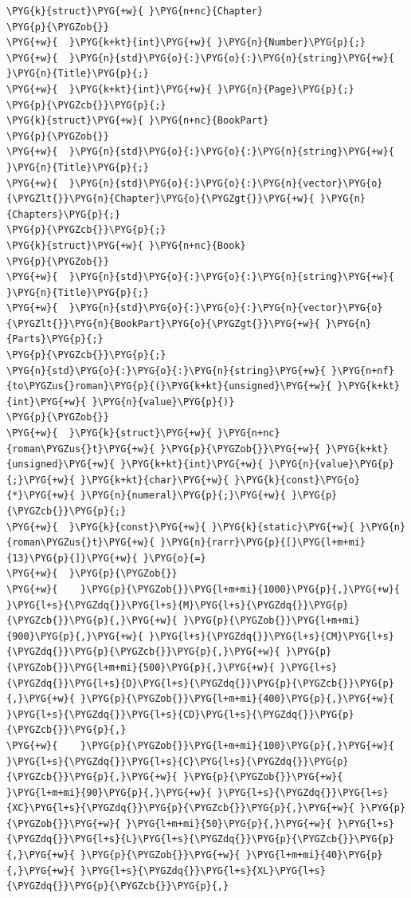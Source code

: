 \begin{codeblockbg}
\begin{Verbatim}[commandchars=\\\{\},breaklines=true,breakanywhere=true,fontsize=\codefont,xleftmargin=17bp]
\PYG{k}{struct}\PYG{+w}{ }\PYG{n+nc}{Chapter}
\PYG{p}{\PYGZob{}}
\PYG{+w}{  }\PYG{k+kt}{int}\PYG{+w}{ }\PYG{n}{Number}\PYG{p}{;}
\PYG{+w}{  }\PYG{n}{std}\PYG{o}{:}\PYG{o}{:}\PYG{n}{string}\PYG{+w}{ }\PYG{n}{Title}\PYG{p}{;}
\PYG{+w}{  }\PYG{k+kt}{int}\PYG{+w}{ }\PYG{n}{Page}\PYG{p}{;}
\PYG{p}{\PYGZcb{}}\PYG{p}{;}
\PYG{k}{struct}\PYG{+w}{ }\PYG{n+nc}{BookPart}
\PYG{p}{\PYGZob{}}
\PYG{+w}{  }\PYG{n}{std}\PYG{o}{:}\PYG{o}{:}\PYG{n}{string}\PYG{+w}{ }\PYG{n}{Title}\PYG{p}{;}
\PYG{+w}{  }\PYG{n}{std}\PYG{o}{:}\PYG{o}{:}\PYG{n}{vector}\PYG{o}{\PYGZlt{}}\PYG{n}{Chapter}\PYG{o}{\PYGZgt{}}\PYG{+w}{ }\PYG{n}{Chapters}\PYG{p}{;}
\PYG{p}{\PYGZcb{}}\PYG{p}{;}
\PYG{k}{struct}\PYG{+w}{ }\PYG{n+nc}{Book}
\PYG{p}{\PYGZob{}}
\PYG{+w}{  }\PYG{n}{std}\PYG{o}{:}\PYG{o}{:}\PYG{n}{string}\PYG{+w}{ }\PYG{n}{Title}\PYG{p}{;}
\PYG{+w}{  }\PYG{n}{std}\PYG{o}{:}\PYG{o}{:}\PYG{n}{vector}\PYG{o}{\PYGZlt{}}\PYG{n}{BookPart}\PYG{o}{\PYGZgt{}}\PYG{+w}{ }\PYG{n}{Parts}\PYG{p}{;}
\PYG{p}{\PYGZcb{}}\PYG{p}{;}
\PYG{n}{std}\PYG{o}{:}\PYG{o}{:}\PYG{n}{string}\PYG{+w}{ }\PYG{n+nf}{to\PYGZus{}roman}\PYG{p}{(}\PYG{k+kt}{unsigned}\PYG{+w}{ }\PYG{k+kt}{int}\PYG{+w}{ }\PYG{n}{value}\PYG{p}{)}
\PYG{p}{\PYGZob{}}
\PYG{+w}{  }\PYG{k}{struct}\PYG{+w}{ }\PYG{n+nc}{roman\PYGZus{}t}\PYG{+w}{ }\PYG{p}{\PYGZob{}}\PYG{+w}{ }\PYG{k+kt}{unsigned}\PYG{+w}{ }\PYG{k+kt}{int}\PYG{+w}{ }\PYG{n}{value}\PYG{p}{;}\PYG{+w}{ }\PYG{k+kt}{char}\PYG{+w}{ }\PYG{k}{const}\PYG{o}{*}\PYG{+w}{ }\PYG{n}{numeral}\PYG{p}{;}\PYG{+w}{ }\PYG{p}{\PYGZcb{}}\PYG{p}{;}
\PYG{+w}{  }\PYG{k}{const}\PYG{+w}{ }\PYG{k}{static}\PYG{+w}{ }\PYG{n}{roman\PYGZus{}t}\PYG{+w}{ }\PYG{n}{rarr}\PYG{p}{[}\PYG{l+m+mi}{13}\PYG{p}{]}\PYG{+w}{ }\PYG{o}{=}
\PYG{+w}{  }\PYG{p}{\PYGZob{}}
\PYG{+w}{    }\PYG{p}{\PYGZob{}}\PYG{l+m+mi}{1000}\PYG{p}{,}\PYG{+w}{ }\PYG{l+s}{\PYGZdq{}}\PYG{l+s}{M}\PYG{l+s}{\PYGZdq{}}\PYG{p}{\PYGZcb{}}\PYG{p}{,}\PYG{+w}{ }\PYG{p}{\PYGZob{}}\PYG{l+m+mi}{900}\PYG{p}{,}\PYG{+w}{ }\PYG{l+s}{\PYGZdq{}}\PYG{l+s}{CM}\PYG{l+s}{\PYGZdq{}}\PYG{p}{\PYGZcb{}}\PYG{p}{,}\PYG{+w}{ }\PYG{p}{\PYGZob{}}\PYG{l+m+mi}{500}\PYG{p}{,}\PYG{+w}{ }\PYG{l+s}{\PYGZdq{}}\PYG{l+s}{D}\PYG{l+s}{\PYGZdq{}}\PYG{p}{\PYGZcb{}}\PYG{p}{,}\PYG{+w}{ }\PYG{p}{\PYGZob{}}\PYG{l+m+mi}{400}\PYG{p}{,}\PYG{+w}{ }\PYG{l+s}{\PYGZdq{}}\PYG{l+s}{CD}\PYG{l+s}{\PYGZdq{}}\PYG{p}{\PYGZcb{}}\PYG{p}{,}
\PYG{+w}{    }\PYG{p}{\PYGZob{}}\PYG{l+m+mi}{100}\PYG{p}{,}\PYG{+w}{ }\PYG{l+s}{\PYGZdq{}}\PYG{l+s}{C}\PYG{l+s}{\PYGZdq{}}\PYG{p}{\PYGZcb{}}\PYG{p}{,}\PYG{+w}{ }\PYG{p}{\PYGZob{}}\PYG{+w}{ }\PYG{l+m+mi}{90}\PYG{p}{,}\PYG{+w}{ }\PYG{l+s}{\PYGZdq{}}\PYG{l+s}{XC}\PYG{l+s}{\PYGZdq{}}\PYG{p}{\PYGZcb{}}\PYG{p}{,}\PYG{+w}{ }\PYG{p}{\PYGZob{}}\PYG{+w}{ }\PYG{l+m+mi}{50}\PYG{p}{,}\PYG{+w}{ }\PYG{l+s}{\PYGZdq{}}\PYG{l+s}{L}\PYG{l+s}{\PYGZdq{}}\PYG{p}{\PYGZcb{}}\PYG{p}{,}\PYG{+w}{ }\PYG{p}{\PYGZob{}}\PYG{+w}{ }\PYG{l+m+mi}{40}\PYG{p}{,}\PYG{+w}{ }\PYG{l+s}{\PYGZdq{}}\PYG{l+s}{XL}\PYG{l+s}{\PYGZdq{}}\PYG{p}{\PYGZcb{}}\PYG{p}{,}

\end{Verbatim}
\end{codeblockbg}
